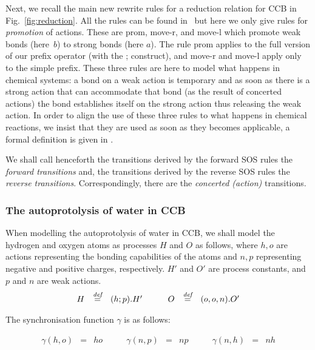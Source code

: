 \documentclass[runningheads]{llncs}
\newcommand{\bydef}{\stackrel{\emph{def}}{=}}
\newcommand{\rulename}[1]{\textsf{#1}}
\begin{document}
Next, we recall the main new rewrite rules for a reduction relation for CCB in Fig.~\ref{fig:reduction}.
All the rules can be found in~\cite{KU16,KUHN201818} but here we only give rules for {\em promotion} 
of actions. These are \rulename{prom}, \rulename{move-r}, and \rulename{move-l} which  
promote weak bonds (here~$b$) to strong bonds (here $a$).
The rule \rulename{prom} applies to the full version of our prefix operator (with the ; construct), and
\rulename{move-r} and \rulename{move-l} apply only to the simple prefix.
These three rules are here to model what happens in chemical systems: a bond on a weak action is 
temporary and as soon as there is a strong action that can accommodate that bond (as the result
of concerted actions) the bond establishes itself on the strong action thus releasing the weak action.
In order to align the use of these three rules to what happens in chemical reactions, we insist
that they are used as soon as they becomes applicable, a formal definition is given in 
\cite{KU16,KUHN201818}.

We shall call henceforth the transitions derived by the forward SOS rules the \emph{forward transitions} 
and, the transitions derived by the reverse SOS rules the \emph{reverse transitions}.
Correspondingly, there are the \emph{concerted (action)} transitions. 

\subsubsection{The autoprotolysis of water in CCB}

When modelling the autoprotolysis of water in CCB, we shall model the hydrogen and oxygen atoms as processes $H$ and $O$ as follows, where 
$h,o$ are actions representing the bonding capabilities of the atoms and $n,p$ 
representing negative and positive charges, respectively. $H'$ and $O'$ are process constants, and
$p$ and $n$ are weak actions.
$$\begin{array}{lllllll}
H & \bydef & (h;p).H' & \quad & O & \bydef & (o,o,n).O'
\end{array}$$

The synchronisation function $\gamma$ is as follows:

$$\begin{array}{lllllllll}
\gamma(h,o) & = & ho \qquad &
\gamma(n,p) & = & np \qquad &
\gamma(n,h) & = & nh
\end{array}$$
\end{document}
